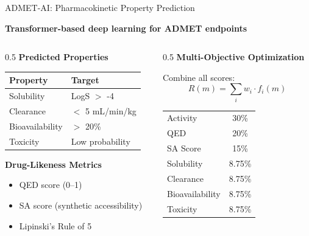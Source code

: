 \documentclass[aspectratio=169,xcolor=table]{beamer}
\begin{document}
\begin{frame}{ADMET-AI: Pharmacokinetic Property Prediction}

\textbf{Transformer-based deep learning for ADMET endpoints}

\vspace{0.2cm}

\begin{columns}
\begin{column}{0.5\textwidth}
\textbf{Predicted Properties}
\begin{table}
\scriptsize
\begin{tabular}{ll}
\toprule
\textbf{Property} & \textbf{Target} \\
\midrule
Solubility & LogS $>$ -4 \\
Clearance & $<$ 5 mL/min/kg \\
Bioavailability & $>$ 20\% \\
Toxicity & Low probability \\
\bottomrule
\end{tabular}
\end{table}

\vspace{0.2cm}

\textbf{Drug-Likeness Metrics}
\begin{itemize}\setlength{\itemsep}{0pt}
    \item QED score (0--1)
    \item SA score (synthetic accessibility)
    \item Lipinski's Rule of 5
\end{itemize}
\end{column}

\begin{column}{0.5\textwidth}
\textbf{Multi-Objective Optimization}

\vspace{0.2cm}

Combine all scores:
\begin{equation*}
R(m) = \sum_{i} w_i \cdot f_i(m)
\end{equation*}

\vspace{0.1cm}
\scriptsize
\begin{tabular}{lc}
Activity & 30\% \\
QED & 20\% \\
SA Score & 15\% \\
Solubility & 8.75\% \\
Clearance & 8.75\% \\
Bioavailability & 8.75\% \\
Toxicity & 8.75\% \\
\end{tabular}
\normalsize
\end{column}
\end{columns}

\end{frame}
\end{document}
